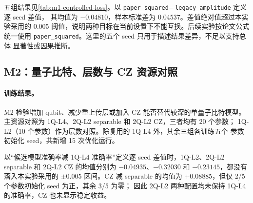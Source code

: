 五组结果见\cref{tab:m1-controlled-loss}。以
\texttt{paper\_squared}$-\,$\texttt{legacy\_amplitude} 定义逐 seed 差值，
其均值为 $-0.04810$，样本标准差为 $0.04537$。差值绝对值超过本实验采用的
$0.005$ 阈值，说明两种目标在当前设置下不能互换。后续实验按论文公式统一使用
\texttt{paper\_squared}。这里的五个 seed 只用于描述结果差异，不足以支持总体
显著性或因果推断。

\subsection{M2：量子比特、层数与 CZ 资源对照}
\label{subsec:m2-resource}

\paragraph{训练结果。}
M2 检验增加 qubit、减少重上传层或加入 CZ 能否替代较深的单量子比特模型。
主资源对照为 1Q-L4、2Q-L2 separable 和 2Q-L2 CZ，三者均有 20 个参数；
1Q-L2（10 个参数）作为层数对照。除复用的 1Q-L4 外，其余三组各训练五个
参数初始化 seed，共新增 15 次优化运行。

\begin{table}[htbp]
    \centering
    \caption{M2 架构训练结果；准确率的 $\pm$ 项表示五个参数初始化 seed 之间的
    样本标准差。}
    \label{tab:m2-training}
\end{table}

以“候选模型准确率减 1Q-L4 准确率”定义逐 seed 差值时，1Q-L2、2Q-L2
separable 和 2Q-L2 CZ 的均值分别为 $-0.04935$、$-0.32030$ 和
$-0.23145$，都没有落入本实验采用的 $\pm0.005$ 区间。CZ 减 separable
的均值为 $+0.08885$，但仅 2/5 个参数初始化 seed 为正，其余 3/5 为零；
因此 2Q-L2 两种配置均未保持 1Q-L4 的准确率，CZ 也未显示稳定收益。

